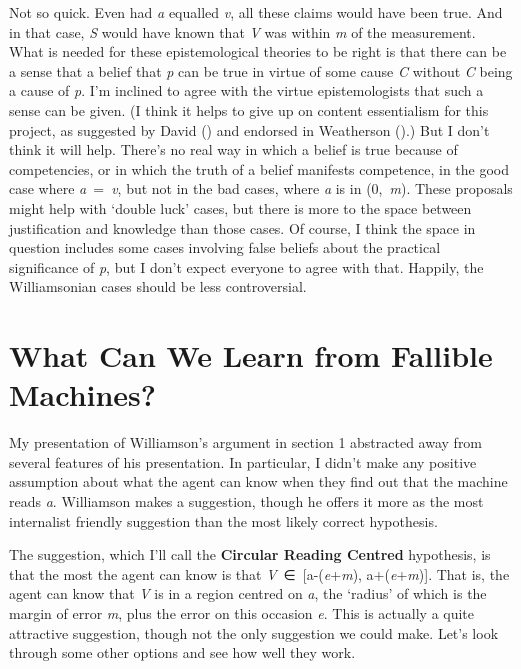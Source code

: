 \documentclass[
  10pt,
  letterpaper,
  DIV=11,
  numbers=noendperiod,
  twoside]{scrartcl}
\begin{document}
Not so quick. Even had \emph{a} equalled \emph{v}, all these claims
would have been true. And in that case, \emph{S} would have known that
\emph{V} was within \emph{m} of the measurement. What is needed for
these epistemological theories to be right is that there can be a sense
that a belief that \emph{p} can be true in virtue of some cause \emph{C}
without \emph{C} being a cause of \emph{p}. I'm inclined to agree with
the virtue epistemologists that such a sense can be given. (I think it
helps to give up on content essentialism for this project, as suggested
by David () and endorsed in Weatherson
().) But I don't think it will
help. There's no real way in which a belief is true because of
competencies, or in which the truth of a belief manifests competence, in
the good case where \emph{a}~=~\emph{v}, but not in the bad cases, where
\emph{a} is in (0,~\emph{m}). These proposals might help with `double
luck' cases, but there is more to the space between justification and
knowledge than those cases. Of course, I think the space in question
includes some cases involving false beliefs about the practical
significance of \emph{p}, but I don't expect everyone to agree with
that. Happily, the Williamsonian cases should be less controversial.

\section{What Can We Learn from Fallible
Machines?}\label{what-can-we-learn-from-fallible-machines}

My presentation of Williamson's argument in section 1 abstracted away
from several features of his presentation. In particular, I didn't make
any positive assumption about what the agent can know when they find out
that the machine reads \emph{a}. Williamson makes a suggestion, though
he offers it more as the most internalist friendly suggestion than the
most likely correct hypothesis.

The suggestion, which I'll call the \textbf{Circular Reading Centred}
hypothesis, is that the most the agent can know is that
\emph{V}~∈~{[}a-(\emph{e}+\emph{m}), a+(\emph{e}+\emph{m}){]}. That is,
the agent can know that \emph{V} is in a region centred on \emph{a}, the
`radius' of which is the margin of error \emph{m}, plus the error on
this occasion \emph{e}. This is actually a quite attractive suggestion,
though not the only suggestion we could make. Let's look through some
other options and see how well they work.
\end{document}
